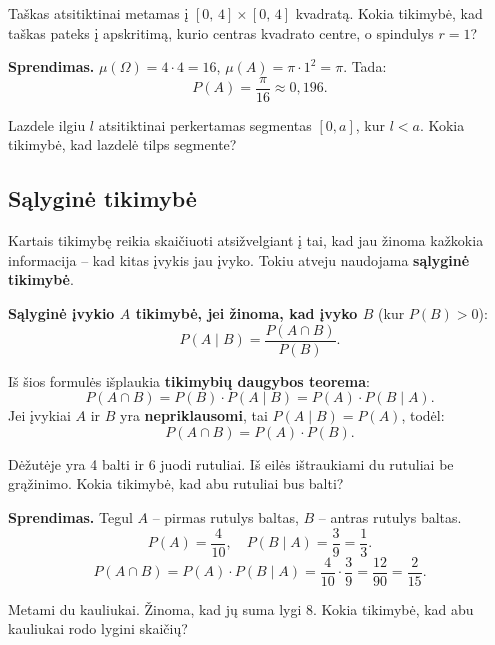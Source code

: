 \begin{example}
Taškas atsitiktinai metamas į $[0,\,4] \times [0,\,4]$ kvadratą. Kokia tikimybė, kad taškas pateks į apskritimą, kurio centras kvadrato centre, o spindulys $r = 1$?

\textbf{Sprendimas.} $\mu(\Omega) = 4 \cdot 4 = 16$, $\mu(A) = \pi \cdot 1^2 = \pi$. Tada:
\[
P(A) = \frac{\pi}{16} \approx 0{,}196.
\]
\end{example}

\begin{exercise}
Lazdele ilgiu $l$ atsitiktinai perkertamas segmentas $[0, a]$, kur $l < a$. Kokia tikimybė, kad lazdelė tilps segmente?
\end{exercise}

\subsection{Sąlyginė tikimybė}

Kartais tikimybę reikia skaičiuoti atsižvelgiant į tai, kad jau žinoma kažkokia informacija – kad kitas įvykis jau įvyko. Tokiu atveju naudojama \textbf{sąlyginė tikimybė}.

\begin{definition}
\textbf{Sąlyginė įvykio $A$ tikimybė, jei žinoma, kad įvyko $B$} (kur $P(B) > 0$):
\[
P(A \mid B) = \frac{P(A \cap B)}{P(B)}.
\]
\end{definition}

\begin{remark}
Iš šios formulės išplaukia \textbf{tikimybių daugybos teorema}:
\[
P(A \cap B) = P(B) \cdot P(A \mid B) = P(A) \cdot P(B \mid A).
\]
Jei įvykiai $A$ ir $B$ yra \textbf{nepriklausomi}, tai $P(A \mid B) = P(A)$, todėl:
\[
P(A \cap B) = P(A) \cdot P(B).
\]
\end{remark}

\begin{example}
Dėžutėje yra 4 balti ir 6 juodi rutuliai. Iš eilės ištraukiami du rutuliai be grąžinimo. Kokia tikimybė, kad abu rutuliai bus balti?

\textbf{Sprendimas.} Tegul $A$ – pirmas rutulys baltas, $B$ – antras rutulys baltas.
\[
P(A) = \frac{4}{10}, \quad P(B \mid A) = \frac{3}{9} = \frac{1}{3}.
\]
\[
P(A \cap B) = P(A) \cdot P(B \mid A) = \frac{4}{10} \cdot \frac{3}{9} = \frac{12}{90} = \frac{2}{15}.
\]
\end{example}

\begin{exercise}
Metami du kauliukai. Žinoma, kad jų suma lygi 8. Kokia tikimybė, kad abu kauliukai rodo lygini skaičių?
\end{exercise}

